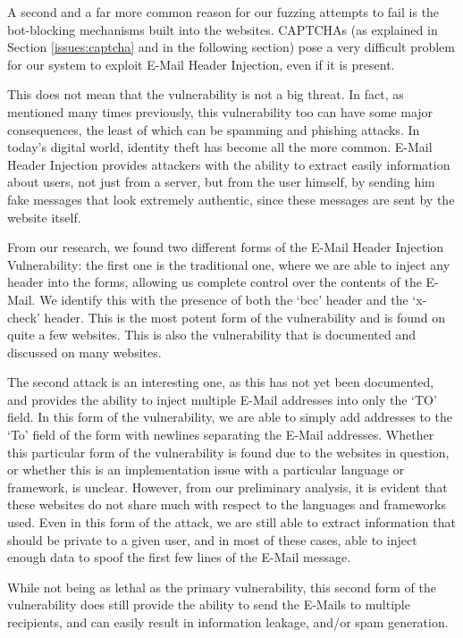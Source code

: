 	A second and a far more common reason for our fuzzing attempts to fail is the bot-blocking mechanisms built into the websites. CAPTCHAs (as explained in Section \ref{issues:captcha} and in the following section) pose a very difficult problem for our system to exploit E-Mail Header Injection, even if it is present.

	This does not mean that the vulnerability is not a big threat. In fact,
    as mentioned many times previously, this vulnerability too can have some major consequences, the least of which can be spamming and phishing attacks. In today's digital world, identity theft has become all the more common. E-Mail Header Injection provides attackers with the ability to extract easily information about users, not just from a server, but from the user himself, by sending him fake messages that look extremely authentic, since these messages are sent by the website itself.
    
    From our research, we found two different forms of the E-Mail Header Injection Vulnerability: the first one is the traditional one, where we are able to inject any header into the forms, allowing us complete control over the contents of the E-Mail. We identify this with the presence of both the `bcc' header and the `x-check' header. This is the most potent form of the vulnerability and is found on quite a few websites. This is also the vulnerability that is documented and discussed on many websites.
    
    The second attack is an interesting one, as this has not yet been documented, and provides the ability to inject multiple E-Mail addresses into only the `TO' field. In this form of the vulnerability, we are able to simply add addresses to the `To' field of the form with newlines separating the E-Mail addresses. Whether this particular form of the vulnerability is found due to the websites in question, or whether this is an implementation issue with a particular language or framework, is unclear. However, from our preliminary analysis, it is evident that these websites do not share much with respect to the languages and frameworks used. 
    Even in this form of the attack, we are still able to extract information that should be private to a given user, and in most of these cases, able to inject enough data to spoof the first few lines of the E-Mail message.
    
    While not being as lethal as the primary vulnerability, this second form of the vulnerability does still provide the ability to send the E-Mails to multiple recipients, and can easily result in information leakage, and/or spam generation.
    

